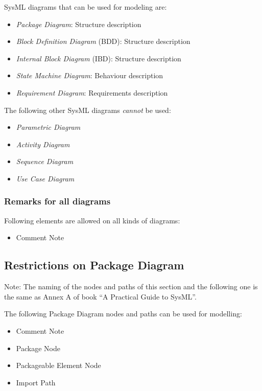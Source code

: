 SysML diagrams that can be used for modeling are:
\begin{itemize}
\item \emph{Package Diagram}: Structure description
\item \emph{Block Definition Diagram} (BDD): Structure description
\item \emph{Internal Block Diagram} (IBD): Structure description
\item \emph{State Machine Diagram}: Behaviour description
\item \emph{Requirement Diagram}: Requirements description
\end{itemize}

The following other SysML diagrams \emph{cannot} be used:
\begin{itemize}
\item \emph{Parametric Diagram}
\item \emph{Activity Diagram}
\item \emph{Sequence Diagram}
\item \emph{Use Case Diagram}
\end{itemize}

\subsubsection{Remarks for all diagrams}

Following elements are allowed on all kinds of diagrams:
\begin{itemize}
\item Comment Note
\end{itemize}


\subsection{Restrictions on Package Diagram}

Note: The naming of the nodes and paths of this section and the
following one is the same as Annex A of book ``A Practical Guide to
SysML''.


The following Package Diagram nodes and paths can be used for
modelling:
\begin{itemize}
\item Comment Note
\item Package Node
\item Packageable Element Node
\item Import Path
\end{itemize}

